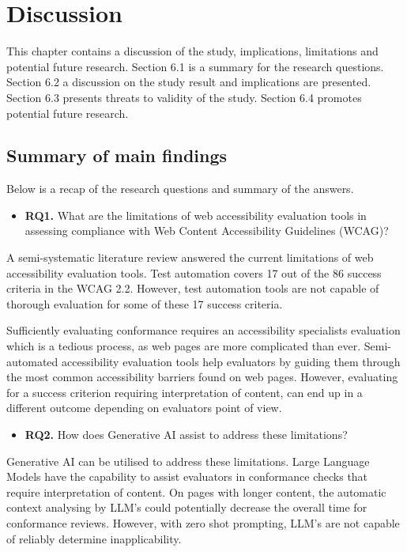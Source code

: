 \chapter{Discussion\label{discussion}}

This chapter contains a discussion of the study, implications, limitations and potential future research. Section 6.1 is a summary for the research questions. Section 6.2 a discussion on the study result and implications are presented. Section 6.3 presents threats to validity of the study. Section 6.4 promotes potential future research.

\section{Summary of main findings}

Below is a recap of the research questions and summary of the answers.

\begin{itemize}
    \item \textbf{RQ1.} What are the limitations of web accessibility evaluation tools in assessing compliance with Web Content Accessibility Guidelines (WCAG)?
\end{itemize}

    A semi-systematic literature review answered the current limitations of web accessibility evaluation tools. Test automation covers 17 out of the 86 success criteria in the WCAG 2.2. However, test automation tools are not capable of thorough evaluation for some of these 17 success criteria. 

    Sufficiently evaluating conformance requires an accessibility specialists evaluation which is a tedious process, as web pages are more complicated than ever. Semi-automated accessibility evaluation tools help evaluators by guiding them through the most common accessibility barriers found on web pages. However, evaluating for a success criterion requiring interpretation of content, can end up in a different outcome depending on evaluators point of view.
    
\begin{itemize}
    \item \textbf{RQ2.} How does Generative AI assist to address these limitations?
\end{itemize}

    Generative AI can be utilised to address these limitations. Large Language Models have the capability to assist evaluators in conformance checks that require interpretation of content. On pages with longer content, the automatic context analysing by LLM's could potentially decrease the overall time for conformance reviews. However, with zero shot prompting, LLM's are not capable of reliably determine inapplicability.

